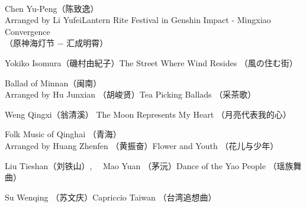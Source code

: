 \documentclass[letter,8pt,poets]{ConcProg}
\begin{document}
\begin{spacing}{1.0}
\begin{programme}{
\\  {}
}
\begin{part}[]
    
    
    \begin{composition}{Chen Yu-Peng（陈致逸） \\Arranged by Li Yufei}{}{Lantern Rite Festival in Genshin Impact - Mingxiao Convergence \\（原神海灯节 $-$ 汇成明霄）}{}      
    \end{composition} 
     \begin{composition}{Yokiko Isomura（磯村由紀子）}{}{The Street Where Wind Resides （風の住む街）}{}      
    \end{composition} 
    
     \begin{composition}{Ballad of Minnan（闽南）\\ Arranged by Hu Junxian （胡峻贤）}{}{Tea Picking Ballads （采茶歌）}{}      
    \end{composition} 
    
    \begin{composition}{Weng Qingxi（翁清溪） }{}{The Moon Represents My Heart （月亮代表我的心）}{}      
    \end{composition} 
    
    \begin{composition}{Folk Music of Qinghai	（青海） \\ Arranged by Huang Zhenfen （黄振奋）}{}{Flower and Youth （花儿与少年） }{}      
    \end{composition} 
    
    \begin{composition}{Liu Tieshan（刘铁山）, \ \ Mao Yuan （茅沅）}{}{Dance of the Yao People （瑶族舞曲）}{}      
    \end{composition} 
    
     \begin{composition}{Su Wenqing （苏文庆）}{}{Capriccio Taiwan （台湾追想曲）}{}      
    \end{composition} 
    
  
    \end{part}
\end{programme}
\newpage


\begin{center}


\end{center}
\end{spacing}
\end{document}
